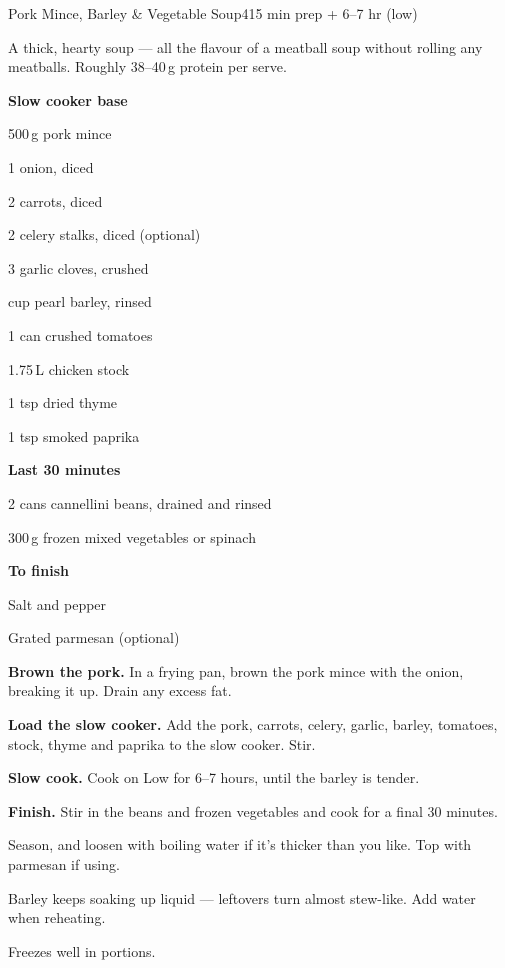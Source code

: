 \begin{recipebox}{Pork Mince, Barley \& Vegetable Soup}{4}{15 min prep + 6--7 hr (low)}

A thick, hearty soup --- all the flavour of a meatball soup without rolling
any meatballs. Roughly 38--40\,g protein per serve.

\begin{ingredients}
  \item[] \textbf{Slow cooker base}
  \item 500\,g pork mince
  \item 1 onion, diced
  \item 2 carrots, diced
  \item 2 celery stalks, diced (optional)
  \item 3 garlic cloves, crushed
  \item {} cup pearl barley, rinsed
  \item 1 can crushed tomatoes
  \item 1.75\,L chicken stock
  \item 1 tsp dried thyme
  \item 1 tsp smoked paprika
  \item[] \textbf{Last 30 minutes}
  \item 2 cans cannellini beans, drained and rinsed
  \item 300\,g frozen mixed vegetables or spinach
  \item[] \textbf{To finish}
  \item Salt and pepper
  \item Grated parmesan (optional)
\end{ingredients}

\begin{method}
  \item \textbf{Brown the pork.} In a frying pan, brown the pork mince with the onion, breaking it up. Drain any excess fat.
  \item \textbf{Load the slow cooker.} Add the pork, carrots, celery, garlic, barley, tomatoes, stock, thyme and paprika to the slow cooker. Stir.
  \item \textbf{Slow cook.} Cook on Low for 6--7 hours, until the barley is tender.
  \item \textbf{Finish.} Stir in the beans and frozen vegetables and cook for a final 30 minutes.
  \item Season, and loosen with boiling water if it's thicker than you like. Top with parmesan if using.
\end{method}

\begin{notelist}
  \item Barley keeps soaking up liquid --- leftovers turn almost stew-like. Add water when reheating.
  \item Freezes well in portions.
\end{notelist}

\end{recipebox}
